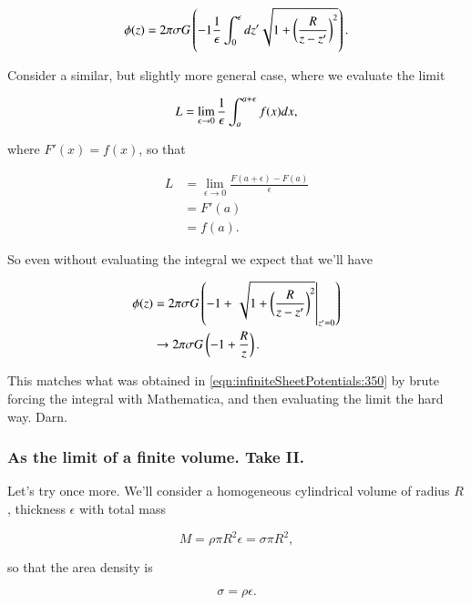 \begin{equation}\label{eqn:infiniteSheetPotentials:370}
\phi(z) = 2 \pi \sigma G 
\left( -1
\frac{1}{\epsilon} \int_0^\epsilon dz' 
\sqrt{1 + \left(\frac{R}{z-z'}\right)^2} \right).
\end{equation}

Consider a similar, but slightly more general case, where we evaluate the limit

\begin{equation}\label{eqn:infiniteSheetPotentials:390}
L = \lim_{\epsilon \rightarrow 0} \frac{1}{\epsilon} \int_a^{a + \epsilon} f(x) dx,
\end{equation}

where $F'(x) = f(x)$, so that

\begin{align*}
L &= 
\lim_{\epsilon \rightarrow 0} \frac{ F(a + \epsilon) - F(a)}{\epsilon} \\
&= F'(a) \\
&= f(a).
\end{align*}

So even without evaluating the integral we expect that we'll have

\begin{align*}
\phi(z) &= 
2 \pi \sigma G 
\left( -1 + {\left.{
\sqrt{1 + \left(\frac{R}{z-z'}\right)^2} }\right\vert}_{z' = 0} \right) \\
&\rightarrow 
2 \pi \sigma G 
\left( -1 + \frac{R}{z} \right).
\end{align*}

This matches what was obtained in \ref{eqn:infiniteSheetPotentials:350} by brute forcing the integral with Mathematica, and then evaluating the limit the hard way.  Darn.

\subsubsection{As the limit of a finite volume.  Take II.}

Let's try once more.  We'll consider a homogeneous cylindrical volume of radius $R$, thickness $\epsilon$ with total mass

\begin{equation}\label{eqn:infiniteSheetPotentials:410}
M = \rho \pi R^2 \epsilon = \sigma \pi R^2,
\end{equation}

so that the area density is 

\begin{equation}\label{eqn:infiniteSheetPotentials:430}
\sigma = \rho \epsilon.
\end{equation}

